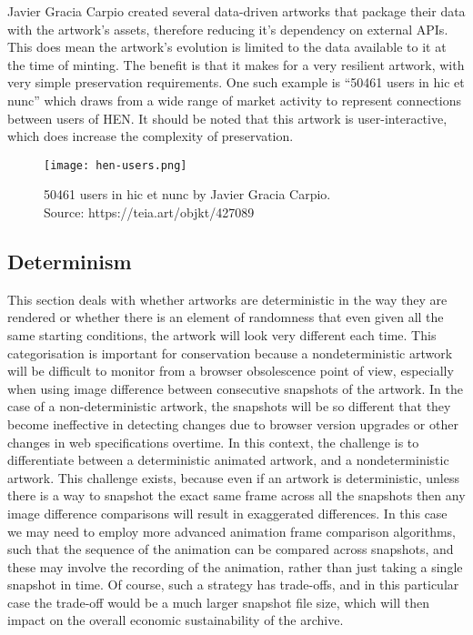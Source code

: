 Javier Gracia Carpio created several data-driven artworks that package their data with the artwork's assets, therefore reducing it's dependency on external APIs. This does mean the artwork's evolution is limited to the data available to it at the time of minting. The benefit is that it makes for a very resilient artwork, with very simple preservation requirements. One such example is ``50461 users in hic et nunc'' which draws from a wide range of market activity to represent connections between users of HEN. It should be noted that this artwork is user-interactive, which does increase the complexity of preservation.

\begin{figure}[H]
    \centering
    \captionsetup{justification=centering}
    \texttt{[image: hen-users.png]}
    \captionsetup{justification=centering}
    \caption[50461 users in hic et nunc by Javier Gracia Carpio]{50461 users in hic et nunc by Javier Gracia Carpio. \\ Source: https://teia.art/objkt/427089}
    \label{fig:hen-users}
\end{figure}


\subsection{Determinism}

This section deals with whether artworks are deterministic in the way they are rendered or whether there is an element of randomness that even given all the same starting conditions, the artwork will look very different each time. This categorisation is important for conservation because a nondeterministic artwork will be difficult to monitor from a browser obsolescence point of view, especially when using image difference between consecutive snapshots of the artwork. In the case of a non-deterministic artwork, the snapshots will be so different that they become ineffective in detecting changes due to browser version upgrades or other changes in web specifications overtime. In this context, the challenge is to differentiate between a deterministic animated artwork, and a nondeterministic artwork. This challenge exists, because even if an artwork is deterministic, unless there is a way to snapshot the exact same frame across all the snapshots then any image difference comparisons will result in exaggerated differences. In this case we may need to employ more advanced animation frame comparison algorithms, such that the sequence of the animation can be compared across snapshots, and these may involve the recording of the animation, rather than just taking a single snapshot in time. Of course, such a strategy has trade-offs, and in this particular case the trade-off would be a much larger snapshot file size, which will then impact on the overall economic sustainability of the archive.

